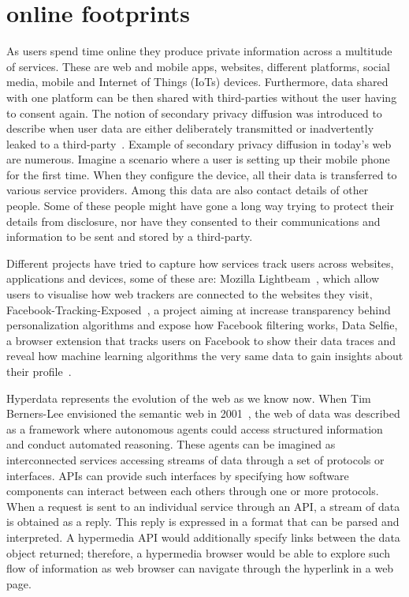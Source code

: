\section{online footprints}
\noindent
As users spend time online they produce private information across a multitude of services. These are web and mobile apps, websites, different platforms, social media, mobile and Internet of Things (IoTs) devices. Furthermore, data shared with one platform can be then shared with third-parties without the user having to consent again. The notion of secondary privacy diffusion was introduced to describe when user data are either deliberately transmitted or inadvertently leaked to a third-party~\cite{krishnamurthy2009privacy}. Example of secondary privacy diffusion in today's web are numerous. Imagine a scenario where a user is setting up their mobile phone for the first time. When they configure the device, all their data is transferred to various service providers. Among this data are also contact details of other people. Some of these people might have gone a long way trying to protect their details from disclosure, nor have they consented to their communications and information to be sent and stored by a third-party. 

Different projects have tried to capture how services track users across websites, applications and devices, some of these are: Mozilla Lightbeam~\cite{lightbeam}, which allow users to visualise how web trackers are connected to the websites they visit, Facebook-Tracking-Exposed~\cite{FTE}, a project aiming at increase transparency behind personalization algorithms and expose how Facebook filtering works, Data Selfie, a browser extension that tracks users on Facebook to show their data traces and reveal how machine learning algorithms the very same data to gain insights about their profile~\cite{data-selfie}.

Hyperdata represents the evolution of the web as we know now. When Tim Berners-Lee envisioned the semantic web in 2001~\cite{SciAMMag}, the web of data was described as a framework where autonomous agents could access structured information and conduct automated reasoning. These agents can be imagined as interconnected services accessing streams of data through a set of protocols or interfaces. APIs can provide such interfaces by specifying how software components can interact between each others through one or more protocols. When a request is sent to an individual service through an API, a stream of data is obtained as a reply. This reply is expressed in a format that can be parsed and interpreted. A hypermedia API would additionally specify links between the data object returned; therefore, a hypermedia browser would be able to explore such flow of information as web browser can navigate through the hyperlink in a web page.\\

